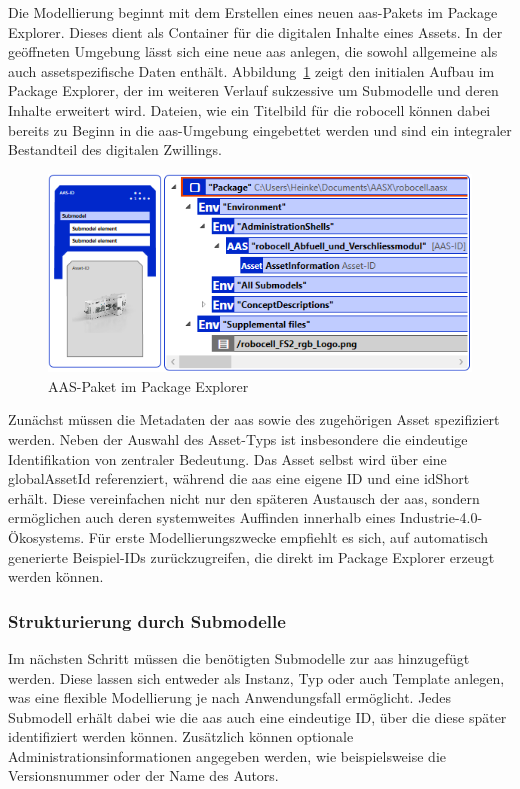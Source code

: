 Die Modellierung beginnt mit dem Erstellen eines neuen \acs{aas}-Pakets im Package Explorer.
Dieses dient als Container für die digitalen Inhalte eines Assets.  
In der geöffneten Umgebung lässt sich eine neue \acs{aas} anlegen, die sowohl allgemeine als auch assetspezifische Daten enthält. 
Abbildung~\ref{fig:NeuesAASPaket} zeigt den initialen Aufbau im Package Explorer, der im weiteren Verlauf sukzessive um Submodelle und deren Inhalte erweitert wird.
Dateien, wie ein Titelbild für die robocell können dabei bereits zu Beginn in die \acs{aas}-Umgebung eingebettet werden und sind ein integraler Bestandteil des digitalen Zwillings.

\begin{figure}[htbp]
    \centering
    \includegraphics{Bilder/ModellierungAAS/Final/NeuesAASPaket.PNG}
    \caption{AAS-Paket im Package Explorer}
    \label{fig:NeuesAASPaket}
\end{figure}

Zunächst müssen die Metadaten der \acs{aas} sowie des zugehörigen Asset spezifiziert werden.
Neben der Auswahl des Asset-Typs ist insbesondere die eindeutige Identifikation von zentraler Bedeutung.
Das Asset selbst wird über eine globalAssetId referenziert, während die \acs{aas} eine eigene ID und eine idShort erhält.
Diese vereinfachen nicht nur den späteren Austausch der \acs{aas}, sondern ermöglichen auch deren systemweites Auffinden innerhalb eines Industrie-4.0-Ökosystems.
Für erste Modellierungszwecke empfiehlt es sich, auf automatisch generierte Beispiel-IDs zurückzugreifen, die direkt im Package Explorer erzeugt werden können.

\subsubsection*{Strukturierung durch Submodelle}
Im nächsten Schritt müssen die benötigten Submodelle zur \acs{aas} hinzugefügt werden.
Diese lassen sich entweder als Instanz, Typ oder auch Template anlegen, was eine flexible Modellierung je nach Anwendungsfall ermöglicht.
Jedes Submodell erhält dabei wie die \acs{aas} auch eine eindeutige ID, über die diese später identifiziert werden können.
Zusätzlich können optionale Administrationsinformationen angegeben werden, wie beispielsweise die Versionsnummer oder der Name des Autors.

